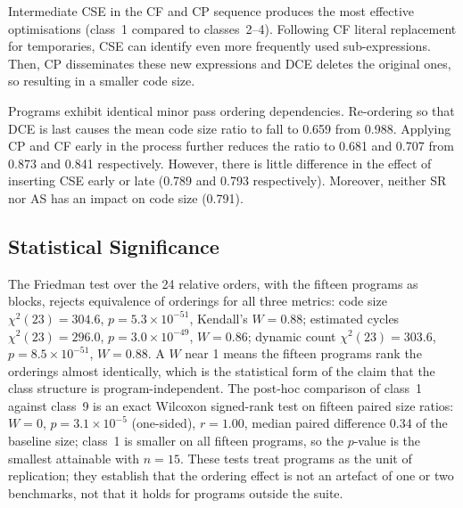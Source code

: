 \documentclass[conference,a4paper]{IEEEtran}
\begin{document}
Intermediate CSE in the CF and CP sequence produces the most effective optimisations (class~1 compared to classes~2--4). Following CF literal replacement for temporaries, CSE can identify even more frequently used sub-expressions. Then, CP disseminates these new expressions and DCE deletes the original ones, so resulting in a smaller code size.

Programs exhibit identical minor pass ordering dependencies. Re-ordering so that DCE is last causes the mean code size ratio to fall to 0.659 from 0.988. Applying CP and CF early in the process further reduces the ratio to 0.681 and 0.707 from 0.873 and 0.841 respectively. However, there is little difference in the effect of inserting CSE early or late (0.789 and 0.793 respectively). Moreover, neither SR nor AS has an impact on code size (0.791).

\subsection{Statistical Significance}
\label{sec:stats}
The Friedman test over the 24 relative orders, with the fifteen programs as blocks, rejects equivalence of orderings for all three metrics: code size $\chi^2(23) = 304.6$, $p = 5.3 \times 10^{-51}$, Kendall's $W = 0.88$; estimated cycles $\chi^2(23) = 296.0$, $p = 3.0 \times 10^{-49}$, $W = 0.86$; dynamic count $\chi^2(23) = 303.6$, $p = 8.5 \times 10^{-51}$, $W = 0.88$. A $W$ near 1 means the fifteen programs rank the orderings almost identically, which is the statistical form of the claim that the class structure is program-independent. The post-hoc comparison of class~1 against class~9 is an exact Wilcoxon signed-rank test on fifteen paired size ratios: $W = 0$, $p = 3.1 \times 10^{-5}$ (one-sided), $r = 1.00$, median paired difference 0.34 of the baseline size; class~1 is smaller on all fifteen programs, so the $p$-value is the smallest attainable with $n = 15$. These tests treat programs as the unit of replication; they establish that the ordering effect is not an artefact of one or two benchmarks, not that it holds for programs outside the suite.
\end{document}
